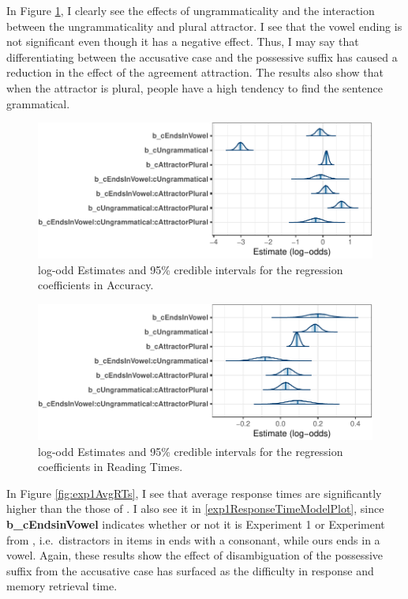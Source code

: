 \documentclass[doc]{apa6}
\begin{document}
In Figure \ref{fig:exp1ResponseModelPlot}, I clearly see the effects of ungrammaticality and the interaction between the ungrammaticality and plural attractor. I see that the vowel ending is not significant even though it has a negative effect. Thus, I may say that differentiating between the accusative case and the possessive suffix has caused a reduction in the effect of the agreement attraction. The results also show that when the attractor is plural, people have a high tendency to find the sentence grammatical.

\begin{figure}
\centering
\includegraphics{AgreementAttraction_files/figure-latex/exp1ResponseModelPlot-1.pdf}
\caption{\label{fig:exp1ResponseModelPlot}log-odd Estimates and 95\% credible intervals for the regression coefficients in Accuracy.}
\end{figure}

\begin{figure}
\centering
\includegraphics{AgreementAttraction_files/figure-latex/exp1ResponseTimeModelPlot-1.pdf}
\caption{\label{fig:exp1ResponseTimeModelPlot}log-odd Estimates and 95\% credible intervals for the regression coefficients in Reading Times.}
\end{figure}

In Figure \ref{fig:exp1AvgRTs}, I see that average response times are significantly higher than the those of \textcite{Lago2018}. I also see it in \ref{exp1ResponseTimeModelPlot}, since \textbf{b\_cEndsinVowel} indicates whether or not it is Experiment 1 or Experiment from \textcite{Lago2018}, i.e.~distractors in items in \textcite{Lago2018} ends with a consonant, while ours ends in a vowel. Again, these results show the effect of disambiguation of the possessive suffix from the accusative case has surfaced as the difficulty in response and memory retrieval time.
\end{document}
